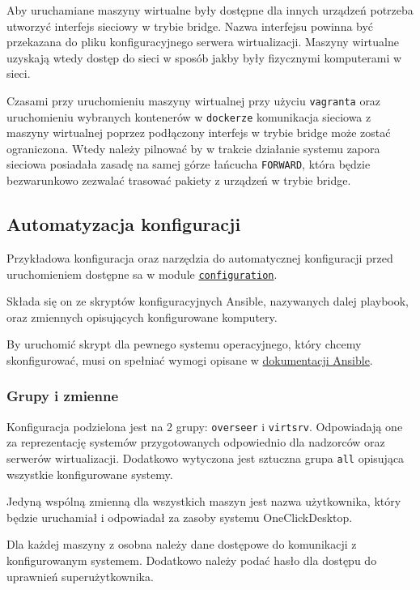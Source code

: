 \documentclass[../opis-rozwiazania.tex]{subfiles}
\begin{document}
Aby uruchamiane maszyny wirtualne były dostępne dla innych urządzeń potrzeba utworzyć interfejs sieciowy w trybie bridge.
Nazwa interfejsu powinna być przekazana do pliku konfiguracyjnego serwera wirtualizacji.
Maszyny wirtualne uzyskają wtedy dostęp do sieci w sposób jakby były fizycznymi komputerami w sieci.

Czasami przy uruchomieniu maszyny wirtualnej przy użyciu \texttt{vagranta} oraz uruchomieniu wybranych kontenerów w \texttt{dockerze} komunikacja sieciowa z maszyny wirtualnej poprzez podłączony interfejs w trybie bridge może zostać ograniczona. Wtedy należy pilnować by w trakcie działanie systemu zapora sieciowa posiadała zasadę na samej górze łańcucha \texttt{FORWARD}, która będzie bezwarunkowo zezwalać trasować pakiety z urządzeń w trybie bridge. 

\subsection{Automatyzacja konfiguracji}
\label{system_requirements.ansible_conf}
Przykładowa konfiguracja oraz narzędzia do automatycznej konfiguracji przed uruchomieniem dostępne sa w module \href{https://github.com/one-click-desktop/configuration}{\texttt{configuration}}.

Składa się on ze skryptów konfiguracyjnych Ansible, nazywanych dalej playbook, oraz zmiennych opisujących konfigurowane komputery.

By uruchomić skrypt dla pewnego systemu operacyjnego, który chcemy skonfigurować, musi on spełniać wymogi opisane w \href{https://docs.ansible.com/ansible/latest/plugins/connection.html#connection-plugins}{dokumentacji Ansible}.

\subsubsection{Grupy i zmienne}
Konfiguracja podzielona jest na 2 grupy: \texttt{overseer} i \texttt{virtsrv}.
Odpowiadają one za reprezentację systemów przygotowanych odpowiednio dla nadzorców oraz serwerów wirtualizacji.
Dodatkowo wytyczona jest sztuczna grupa \texttt{all} opisująca wszystkie konfigurowane systemy.

Jedyną wspólną zmienną dla wszystkich maszyn jest nazwa użytkownika, który będzie uruchamiał i odpowiadał za zasoby systemu OneClickDesktop.

Dla każdej maszyny z osobna należy dane dostępowe do komunikacji z konfigurowanym systemem. Dodatkowo należy podać hasło dla dostępu do uprawnień superużytkownika.
\end{document}
